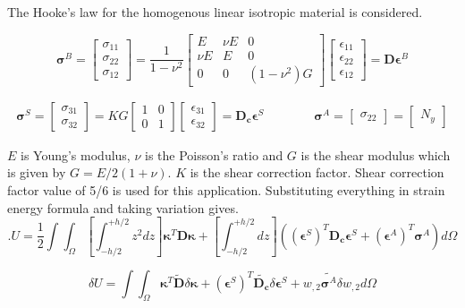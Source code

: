 \documentclass[9pt]{beamer}
\newcommand{\vect}[1]{\boldsymbol{#1}}
\begin{document}
\begin{frame}

The Hooke's law for the  homogenous linear isotropic material is considered.

\begin{equation*}
\vect{\sigma}^B = \begin{bmatrix}
\sigma_{11}
\\
\sigma_{22}
\\
 \sigma_{12}
\end{bmatrix}
=\dfrac{1}{1-\nu^2}
\begin{bmatrix}
E & \nu E & 0
\\
\nu E & E & 0
\\
0 & 0 & (1-\nu^2)G
\end{bmatrix}
\begin{bmatrix}
\epsilon_{11}
\\
\epsilon_{22}
\\
 \epsilon_{12}
\end{bmatrix}
=
\vect{D}
\vect{ \epsilon}^B
\end{equation*}


\begin{align*}
\vect{\sigma}^S = \begin{bmatrix}
\sigma_{31}
\\
 \sigma_{32}
\end{bmatrix}
=KG
\begin{bmatrix}
1 & 0 
\\
0 & 1 
\end{bmatrix}
\begin{bmatrix}
\epsilon_{31}
\\
\epsilon_{32}
\end{bmatrix}
=
\vect{D_c} \vect{\epsilon}^S
\qquad
\qquad
\vect{\sigma}^A = \begin{bmatrix}
\sigma_{22}
\end{bmatrix}
=
\begin{bmatrix}
N_y
\end{bmatrix}
\end{align*}



$E$ is Young's modulus, $\nu$ is the Poisson's ratio and $G$ is the shear modulus which is given by $G=E / 2 ( 1+\nu ) $. $K$ is the shear correction factor. Shear correction factor value of 5/6 is used for this application. Substituting everything in strain energy formula and taking variation gives. 
\begin{equation*}. 
U=\frac{1}{2} \int\int_\Omega \left[ \int_{-h/2}^{+h/2} z^2 dz\right] \vect{\kappa}^T {\vect{D}} \vect{\kappa} 
+ \left[ \int_{-h/2}^{+h/2} dz\right]
(
\left(\vect{\epsilon}^S
\right)^T {\vect{D_c}} \vect{\epsilon}^S 
+ 
 \left(\vect{\epsilon}^A\right)^T \vect{\sigma}^A 
 ) d \Omega
\end{equation*}


\begin{equation*}
\delta U=\int\int_\Omega 
\vect{\kappa}^T \vect{\tilde{D}} \delta\vect{\kappa} 
+ 
\left(\vect{\epsilon}^S\right)^T \vect{\tilde{D_c}} \delta \vect{\epsilon}^S 
+ 
w_{,2}\tilde{\vect{\sigma}^A} \delta w_{,2} d \Omega
\end{equation*}

\end{frame}
\end{document}
